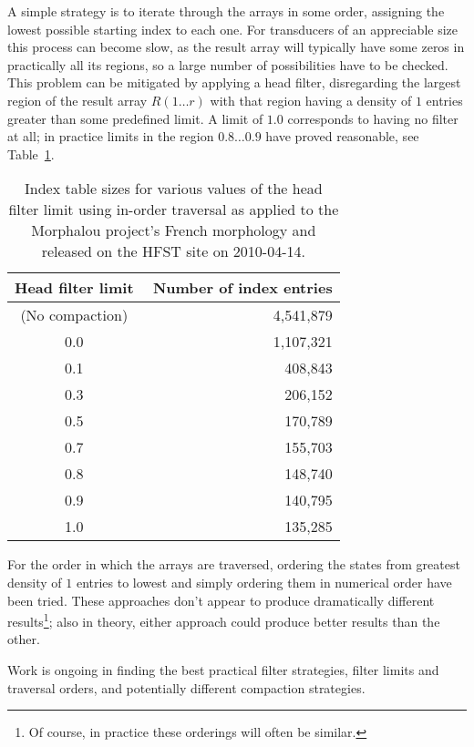 \documentclass{llncs}
\begin{document}
A simple strategy is to iterate through the arrays in some order, assigning
the lowest possible starting index to each one. For transducers of an
appreciable size this process can become slow, as the result array
will typically have some zeros in practically all its regions, so a large
number of possibilities have to be checked. This problem can be mitigated by
applying a head filter, disregarding the largest region of the result array
$R(1 \ldots r)$ with that region having a density of $1$ entries greater than
some predefined limit. A limit of $1.0$ corresponds to having no filter at all;
in practice limits in the region $0.8 \ldots 0.9$ have proved reasonable, see Table~\ref{tab:compaction}.

\begin{table}[htb!]
\begin{center}
\caption{Index table sizes for various values of the head filter limit using
in-order traversal as applied to the Morphalou project's French morphology and
released on the HFST site on 2010-04-14.}
 \label{tab:compaction}
\begin{tabular}{c r}
\hline
Head filter limit  & \,\,Number of index entries \\
\hline
(No compaction) & 4,541,879 \\
0.0 & 1,107,321 \\
0.1 & 408,843 \\
0.3 & 206,152 \\
0.5 & 170,789 \\
0.7 & 155,703 \\
0.8 & 148,740 \\
0.9 & 140,795 \\
1.0 & 135,285 \\
\hline
\end{tabular}
\end{center}
\end{table}

For the order in which the arrays are traversed, ordering the states from
greatest density of $1$ entries to lowest and simply ordering them in
numerical order have been tried. These approaches don't appear to produce
dramatically different results\footnote{Of course, in practice these orderings
will often be similar.}; also in theory, either approach could
produce better results than the other.

Work is ongoing in finding the best practical filter strategies, filter
limits and traversal orders, and potentially different compaction strategies.
\end{document}
